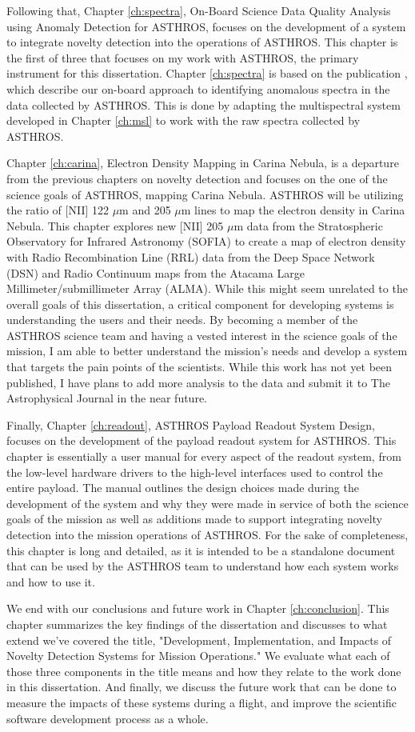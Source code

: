 Following that, Chapter \ref{ch:spectra}, On-Board Science Data Quality Analysis using Anomaly Detection for ASTHROS, focuses on the development of a system to integrate novelty detection into the operations of ASTHROS.
This chapter is the first of three that focuses on my work with ASTHROS, the primary instrument for this dissertation.
Chapter \ref{ch:spectra} is based on the publication \cite{horton2024board}, which describe our on-board approach to identifying anomalous spectra in the data collected by ASTHROS.
This is done by adapting the multispectral system developed in Chapter \ref{ch:msl} to work with the raw spectra collected by ASTHROS.

Chapter \ref{ch:carina}, Electron Density Mapping in Carina Nebula, is a departure from the previous chapters on novelty detection and focuses on the one of the science goals of ASTHROS, mapping Carina Nebula. 
ASTHROS will be utilizing the ratio of [NII] 122 $\mu$m and 205 $\mu$m lines to map the electron density in Carina Nebula.
This chapter explores new [NII] 205 $\mu$m data from the Stratospheric Observatory for Infrared Astronomy (SOFIA) to create a map of electron density with Radio Recombination Line (RRL) data from the Deep Space Network (DSN) and Radio Continuum maps from the Atacama Large Millimeter/submillimeter Array (ALMA).
While this might seem unrelated to the overall goals of this dissertation, a critical component for developing systems is understanding the users and their needs.
By becoming a member of the ASTHROS science team and having a vested interest in the science goals of the mission, I am able to better understand the mission's needs and develop a system that targets the pain points of the scientists.
While this work has not yet been published, I have plans to add more analysis to the data and submit it to The Astrophysical Journal in the near future.

Finally, Chapter \ref{ch:readout}, ASTHROS Payload Readout System Design, focuses on the development of the payload readout system for ASTHROS.
This chapter is essentially a user manual for every aspect of the readout system, from the low-level hardware drivers to the high-level interfaces used to control the entire payload.
The manual outlines the design choices made during the development of the system and why they were made in service of both the science goals of the mission as well as additions made to support integrating novelty detection into the mission operations of ASTHROS.
For the sake of completeness, this chapter is long and detailed, as it is intended to be a standalone document that can be used by the ASTHROS team to understand how each system works and how to use it.

We end with our conclusions and future work in Chapter \ref{ch:conclusion}.
This chapter summarizes the key findings of the dissertation and discusses to what extend we've covered the title, "Development, Implementation, and Impacts of Novelty Detection Systems for Mission Operations."
We evaluate what each of those three components in the title means and how they relate to the work done in this dissertation.
And finally, we discuss the future work that can be done to measure the impacts of these systems during a flight, and improve the scientific software development process as a whole.